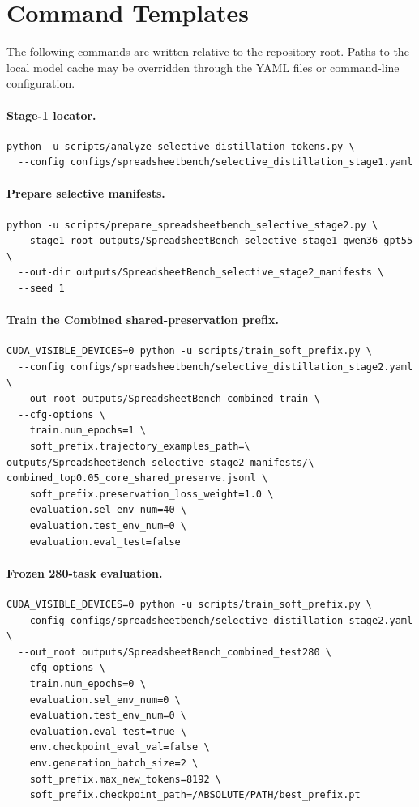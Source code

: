 \section{Command Templates}
\label{app:commands}

The following commands are written relative to the repository root.  Paths to the local model cache may be overridden through the YAML files or command-line configuration.

\paragraph{Stage-1 locator.}
\begin{verbatim}
python -u scripts/analyze_selective_distillation_tokens.py \
  --config configs/spreadsheetbench/selective_distillation_stage1.yaml
\end{verbatim}

\paragraph{Prepare selective manifests.}
\begin{verbatim}
python -u scripts/prepare_spreadsheetbench_selective_stage2.py \
  --stage1-root outputs/SpreadsheetBench_selective_stage1_qwen36_gpt55 \
  --out-dir outputs/SpreadsheetBench_selective_stage2_manifests \
  --seed 1
\end{verbatim}

\paragraph{Train the Combined shared-preservation prefix.}
\begin{verbatim}
CUDA_VISIBLE_DEVICES=0 python -u scripts/train_soft_prefix.py \
  --config configs/spreadsheetbench/selective_distillation_stage2.yaml \
  --out_root outputs/SpreadsheetBench_combined_train \
  --cfg-options \
    train.num_epochs=1 \
    soft_prefix.trajectory_examples_path=\
outputs/SpreadsheetBench_selective_stage2_manifests/\
combined_top0.05_core_shared_preserve.jsonl \
    soft_prefix.preservation_loss_weight=1.0 \
    evaluation.sel_env_num=40 \
    evaluation.test_env_num=0 \
    evaluation.eval_test=false
\end{verbatim}

\paragraph{Frozen 280-task evaluation.}
\begin{verbatim}
CUDA_VISIBLE_DEVICES=0 python -u scripts/train_soft_prefix.py \
  --config configs/spreadsheetbench/selective_distillation_stage2.yaml \
  --out_root outputs/SpreadsheetBench_combined_test280 \
  --cfg-options \
    train.num_epochs=0 \
    evaluation.sel_env_num=0 \
    evaluation.test_env_num=0 \
    evaluation.eval_test=true \
    env.checkpoint_eval_val=false \
    env.generation_batch_size=2 \
    soft_prefix.max_new_tokens=8192 \
    soft_prefix.checkpoint_path=/ABSOLUTE/PATH/best_prefix.pt
\end{verbatim}

